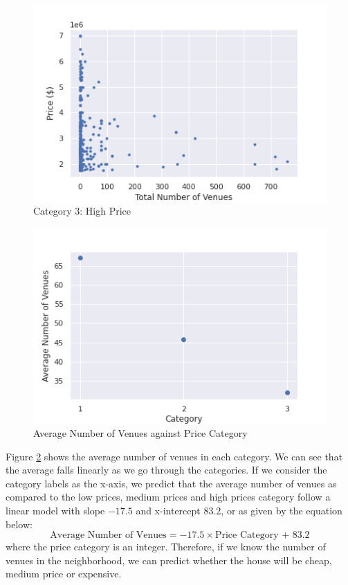 \documentclass{article}
\begin{document}
\begin{figure}[ht]
\begin{minipage}{0.3\linewidth}
		\includegraphics[width=\textwidth]{hs3.png}
		\caption{Category 3: High Price}
		\label{fig:hs3}
	\end{minipage}
\end{figure}

\begin{figure}[hbt!]
	
	\includegraphics[width=\textwidth]{avg.png}
	\caption{Average Number of Venues against Price Category}
	\label{fig:avg}
	
\end{figure}

Figure \ref{fig:avg} shows the average number of venues in each category. We can see that the average falls linearly as we go through the categories. If we consider the category labels as the x-axis, we predict that the average number of venues as compared to the low prices, medium prices and high prices category follow a linear model with slope $-17.5$ and x-intercept $83.2$, or as given by the equation below:
\begin{equation}
	\textrm{Average Number of Venues} = -17.5\times \textrm{Price Category + 83.2}
\end{equation}
where the price category is an integer. Therefore, if we know the number of venues in the neighborhood, we can predict whether the house will be cheap, medium price or expensive.\\
\end{document}
